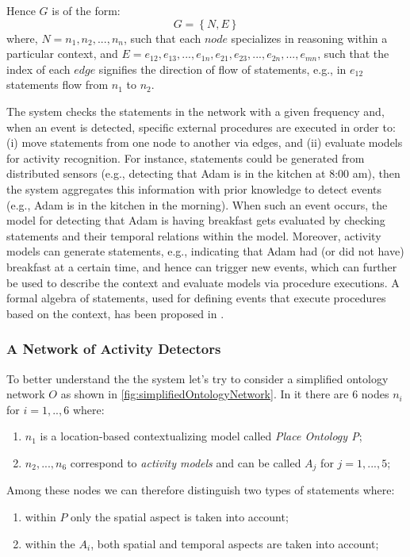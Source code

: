 \documentclass{thesisreport}
\begin{document}
 Hence $G$ is of the form:
 \begin{equation}
     G = \left \{ N, E \right \}
 \end{equation}
 where, $N = n_1, n_2, ... , n_n$, such that each $node$ specializes in reasoning within a particular context, and $ E = e_{12},e_{13},...,e_{1n},e_{21},e_{23},...,e_{2n},...,e_{mn}$, such that the index of each $edge$ signifies the direction of flow of statements, e.g., in $e_{12}$ statements flow from $n_1$ to $n_2$. 
 
 The system checks the statements in the network with a given frequency and, when an event is detected, specific external procedures are executed in order to: (i) move statements from one node to another via edges, and (ii) evaluate models for activity recognition. For instance, statements could be generated from distributed sensors (e.g., detecting that Adam is in the kitchen at 8:00 am), then the system aggregates this information with prior knowledge to detect events (e.g., Adam is in the kitchen in the morning). When such an event occurs, the model for detecting that Adam is having breakfast gets evaluated by checking statements and their temporal relations within the model.
 Moreover, activity models can generate statements, e.g., indicating that Adam had (or did not have) breakfast at a certain time, and hence can trigger new events, which can further be used to describe the context and evaluate models via procedure executions. A formal algebra of statements, used for defining events that execute procedures based on the context, has been proposed in \cite{buoncompagni2017towards}.
 
 \subsubsection{A Network of Activity Detectors}
 To better understand the the system let's try to consider a simplified ontology network $O$ as shown in \ref{fig:simplifiedOntologyNetwork}.
 In it there are 6 nodes $n_i$ for $i=1,..,6$ where:
 \begin{enumerate}
    \item $n_1$ is a location-based contextualizing model called \textit{Place Ontology P};
    \item $n_2,...,n_6$ correspond to \textit{activity models} and can be called $A_j$ for $j=1,...,5$;
 \end{enumerate}
 
 Among these nodes we can therefore distinguish two types of statements where:
 \begin{enumerate}
     \item within $P$ only the spatial aspect is taken into account;
     \item within the $A_i$, both spatial and temporal aspects are taken into account;
 \end{enumerate}
 
\end{document}
